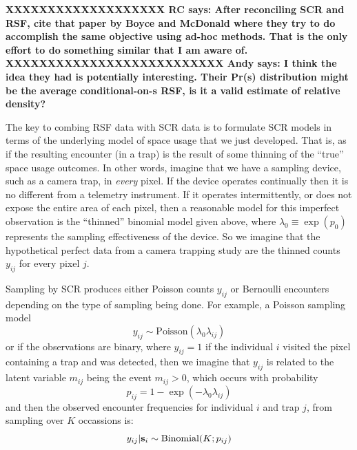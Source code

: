 {\bf XXXXXXXXXXXXXXXXXXX
RC says: After reconciling SCR and RSF, cite that paper
by Boyce and McDonald where they try to do accomplish the same
objective using ad-hoc methods. That is the only effort to do
something similar that I am aware of.
XXXXXXXXXXXXXXXXXXXXXXXXXX
Andy says: I think the idea they had is potentially interesting. Their Pr(s)
distribution
might be the average conditional-on-s RSF, is it a valid estimate of
relative density?
}

The key to combing RSF data with SCR data is to formulate SCR models
in terms of the underlying model of space usage that we just
developed. That is, as if the resulting encounter (in a trap) is the
result of some thinning of the ``true'' space usage outcomes.
In other words, imagine that we have a sampling
device, such as a camera trap, in {\it every} pixel. If the device
operates continually then it is no different from a telemetry
instrument.  If it operates intermittently, or does not expose the
entire area of each pixel, then a reasonable model for this imperfect
observation is the ``thinned'' binomial model given above, where
$\lambda_{0} \equiv \exp(p_{0})$ represents the sampling
effectiveness of the device. So we imagine that the hypothetical
perfect data from a camera trapping study are the thinned counts
$y_{ij}$ for every pixel $j$.

Sampling by SCR produces either Poisson counts $y_{ij}$ or Bernoulli
encounters depending on the type of sampling being done. For example,
a Poisson sampling model
\[
y_{ij} \sim \mbox{Poisson}(\lambda_{0} \lambda_{ij})
\]
or if the observations are binary,
where $y_{ij} = 1$ if the individual $i$ visited
the pixel containing a trap and was detected, then we imagine that
$y_{ij}$ is related to the latent variable $m_{ij}$ being the event
$m_{ij}>0$, which occurs with probability
\[
 p_{ij} = 1-\exp(- \lambda_{0} \lambda_{ij})
\]
and then the observed encounter frequencies for individual $i$ and trap $j$, from
sampling over $K$ occassions is:
\[
 y_{ij}|{\bf s}_{i} \sim \mbox{Binomial}(K; p_{ij})
\]

